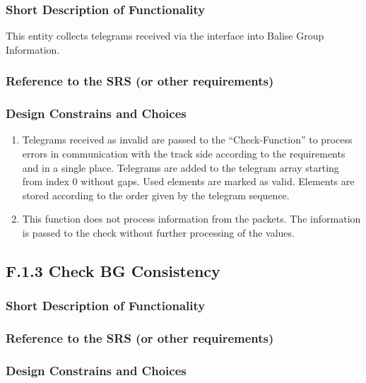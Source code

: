 \documentclass{template/openetcs_report}
\begin{document}
\subsubsection{Short Description of Functionality}
This entity collects telegrams received via the interface into Balise Group Information.
	
\subsubsection{Reference to the SRS (or other requirements)}
\subsubsection{Design Constrains and Choices}
\begin{enumerate}
\item Telegrams received as invalid are passed to the ``Check-Function'' to process errors in communication with the track side according to the requirements and in a single place.
Telegrams are added to the telegram array starting from index 0 without gaps. Used elements are marked as valid. Elements are stored according to the order given by the telegram sequence.
\item This function does not process information from the packets. The information is passed to the check without further processing of the values. 
\end{enumerate}



\subsection{F.1.3 Check BG Consistency}

\subsubsection{Short Description of Functionality}
\subsubsection{Reference to the SRS (or other requirements)}
\subsubsection{Design Constrains and Choices}
\end{document}
